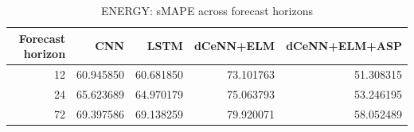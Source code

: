 \begin{table}
\caption{ENERGY: sMAPE across forecast horizons}
\begin{tabular}{rrrrr}
\toprule
Forecast horizon & CNN & LSTM & dCeNN+ELM & dCeNN+ELM+ASP \\
\midrule
12 & 60.945850 & 60.681850 & 73.101763 & 51.308315 \\
24 & 65.623689 & 64.970179 & 75.063793 & 53.246195 \\
72 & 69.397586 & 69.138259 & 79.920071 & 58.052489 \\
\bottomrule
\end{tabular}
\end{table}
